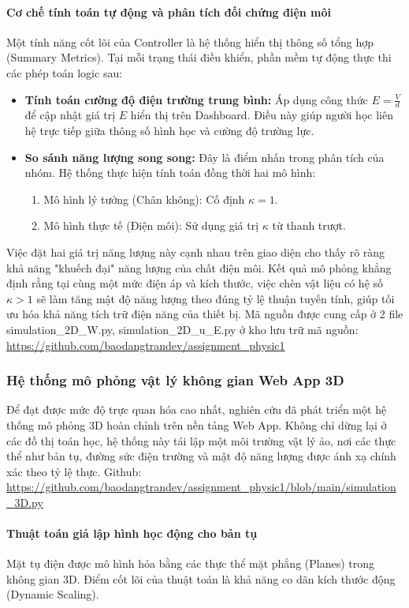\paragraph{Cơ chế tính toán tự động và phân tích đối chứng điện môi}
Một tính năng cốt lõi của Controller là hệ thống hiển thị thông số tổng hợp (Summary Metrics). Tại mỗi trạng thái điều khiển, phần mềm tự động thực thi các phép toán logic sau:
\begin{itemize}
    \item \textbf{Tính toán cường độ điện trường trung bình:} Áp dụng công thức $E = \frac{V}{d}$ để cập nhật giá trị $E$ hiển thị trên Dashboard. Điều này giúp người học liên hệ trực tiếp giữa thông số hình học và cường độ trường lực.
    \item \textbf{So sánh năng lượng song song:} Đây là điểm nhấn trong phân tích của nhóm. Hệ thống thực hiện tính toán đồng thời hai mô hình:
    \begin{enumerate}
        \item Mô hình lý tưởng (Chân không): Cố định $\kappa = 1$.
        \item Mô hình thực tế (Điện môi): Sử dụng giá trị $\kappa$ từ thanh trượt.
    \end{enumerate}
\end{itemize}
Việc đặt hai giá trị năng lượng này cạnh nhau trên giao diện cho thấy rõ ràng khả năng "khuếch đại" năng lượng của chất điện môi. Kết quả mô phỏng khẳng định rằng tại cùng một mức điện áp và kích thước, việc chèn vật liệu có hệ số $\kappa > 1$ sẽ làm tăng mật độ năng lượng theo đúng tỷ lệ thuận tuyến tính, giúp tối ưu hóa khả năng tích trữ điện năng của thiết bị. Mã nguồn được cung cấp ở 2 file simulation\_2D\_W.py, simulation\_2D\_u\_E.py ở kho lưu trữ mã nguồn: \url{https://github.com/baodangtrandev/assignment_physic1}

\subsubsection{Hệ thống mô phỏng vật lý không gian Web App 3D}
Để đạt được mức độ trực quan hóa cao nhất, nghiên cứu đã phát triển một hệ thống mô phỏng 3D hoàn chỉnh trên nền tảng Web App. Không chỉ dừng lại ở các đồ thị toán học, hệ thống này tái lập một môi trường vật lý ảo, nơi các thực thể như bản tụ, đường sức điện trường và mật độ năng lượng được ánh xạ chính xác theo tỷ lệ thực. Github: \url{https://github.com/baodangtrandev/assignment_physic1/blob/main/simulation_3D.py}
\paragraph{Thuật toán giả lập hình học động cho bản tụ\\}
Mặt tụ điện được mô hình hóa bằng các thực thể mặt phẳng (Planes) trong không gian 3D. Điểm cốt lõi của thuật toán là khả năng co dãn kích thước động (Dynamic Scaling).

